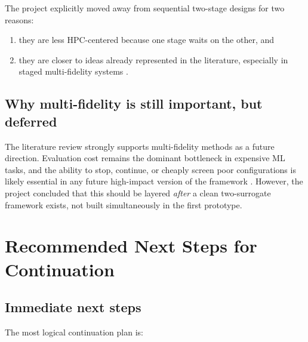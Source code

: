 \documentclass[11pt]{article}
\begin{document}
The project explicitly moved away from sequential two-stage designs for two reasons:
\begin{enumerate}[leftmargin=1.5em]
    \item they are less HPC-centered because one stage waits on the other, and
    \item they are closer to ideas already represented in the literature, especially in staged multi-fidelity systems \cite{koziel2025antenna, won2025review}.
\end{enumerate}

\subsection{Why multi-fidelity is still important, but deferred}

The literature review strongly supports multi-fidelity methods as a future direction. Evaluation cost remains the dominant bottleneck in expensive ML tasks, and the ability to stop, continue, or cheaply screen poor configurations is likely essential in any future high-impact version of the framework \cite{won2025review, do2024review, rakotoarison2024ifbo, wu2020takg}. However, the project concluded that this should be layered \emph{after} a clean two-surrogate framework exists, not built simultaneously in the first prototype.

\section{Recommended Next Steps for Continuation}

\subsection{Immediate next steps}

The most logical continuation plan is:
\end{document}

